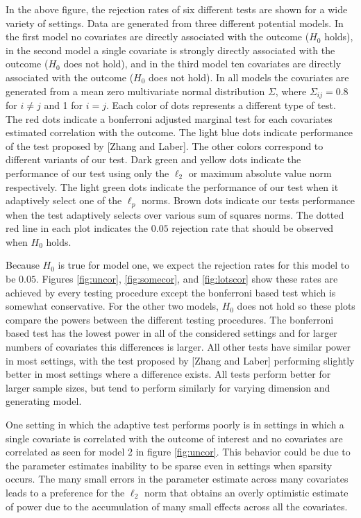 \documentclass{article}
\begin{document}
In the above figure, the rejection rates of six different tests are shown for a wide variety of settings.  Data are generated from three different potential models.  In the first model no covariates are directly associated with the outcome ($H_0$ holds), in the second model a single covariate is strongly directly associated with the outcome ($H_0$ does not hold), and in the third model ten covariates are directly associated with the outcome ($H_0$ does not hold).  In all models the covariates are generated from a mean zero multivariate normal distribution $\Sigma$, where $\Sigma_{ij} = 0.8$ for $i \neq j$ and 1 for $i = j$.  Each color of dots represents a different type of test.  The red dots indicate a bonferroni adjusted marginal test for each covariates estimated correlation with the outcome. The light blue dots indicate performance of the test proposed by [Zhang and Laber]. The other colors correspond to different variants of our test. Dark green and yellow dots indicate the performance of our test using only the $\ell_2$ or maximum absolute value norm respectively.  The light green dots indicate the performance of our test when it adaptively select one of the $\ell_p$ norms. Brown dots indicate our tests performance when the test adaptively selects over various sum of squares norms. The dotted red line in each plot indicates the $0.05$ rejection rate that should be observed when $H_0$ holds.  

Because $H_0$ is true for model one, we expect the rejection rates for this model to be $0.05$.  Figures \ref{fig:uncor}, \ref{fig:somecor}, and \ref{fig:lotscor} show these rates are achieved by every testing procedure except the bonferroni based test which is somewhat conservative.  For the other two models, $H_0$ does not hold so these plots compare the powers between the different testing procedures.  The bonferroni based test has the lowest power in all of the considered settings and for larger numbers of covariates this differences is larger. All other tests have similar power in most settings, with the test proposed by [Zhang and Laber] performing slightly better in most settings where a difference exists.  All tests perform better for larger sample sizes, but tend to perform similarly for varying dimension and generating model.

One setting in which the adaptive test performs poorly is in settings in which a single covariate is correlated with the outcome of interest and no covariates are correlated as seen for model 2 in figure \ref{fig:uncor}. This behavior could be due to the parameter estimates inability to be sparse even in settings when sparsity occurs.  The many small errors in the parameter estimate across many covariates leads to a preference for the $\ell_2$ norm that obtains an overly optimistic estimate of power due to the accumulation of many small effects across all the covariates.
\end{document}
